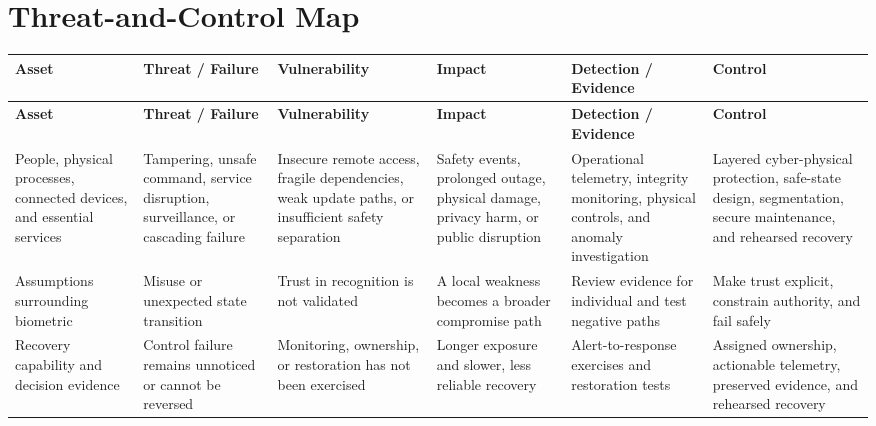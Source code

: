\documentclass[11pt,letterpaper]{article}
\begin{document}
\section*{Threat-and-Control Map}
\begingroup\scriptsize\setlength{\tabcolsep}{2pt}
\begin{longtable}{>{\raggedright\arraybackslash}p{}>{\raggedright\arraybackslash}p{}>{\raggedright\arraybackslash}p{}>{\raggedright\arraybackslash}p{}>{\raggedright\arraybackslash}p{}>{\raggedright\arraybackslash}p{}}
\toprule\rowcolor{Navy}\color{white}\textbf{Asset} & \color{white}\textbf{Threat / Failure} & \color{white}\textbf{Vulnerability} & \color{white}\textbf{Impact} & \color{white}\textbf{Detection / Evidence} & \color{white}\textbf{Control}\\\midrule
\endfirsthead
\toprule\rowcolor{Navy}\color{white}\textbf{Asset} & \color{white}\textbf{Threat / Failure} & \color{white}\textbf{Vulnerability} & \color{white}\textbf{Impact} & \color{white}\textbf{Detection / Evidence} & \color{white}\textbf{Control}\\\midrule
\endhead
People, physical processes, connected devices, and essential services & Tampering, unsafe command, service disruption, surveillance, or cascading failure & Insecure remote access, fragile dependencies, weak update paths, or insufficient safety separation & Safety events, prolonged outage, physical damage, privacy harm, or public disruption & Operational telemetry, integrity monitoring, physical controls, and anomaly investigation & Layered cyber-physical protection, safe-state design, segmentation, secure maintenance, and rehearsed recovery\\\midrule
Assumptions surrounding biometric & Misuse or unexpected state transition & Trust in recognition is not validated & A local weakness becomes a broader compromise path & Review evidence for individual and test negative paths & Make trust explicit, constrain authority, and fail safely\\\midrule
Recovery capability and decision evidence & Control failure remains unnoticed or cannot be reversed & Monitoring, ownership, or restoration has not been exercised & Longer exposure and slower, less reliable recovery & Alert-to-response exercises and restoration tests & Assigned ownership, actionable telemetry, preserved evidence, and rehearsed recovery\\\midrule
\bottomrule
\end{longtable}
\endgroup
\end{document}
